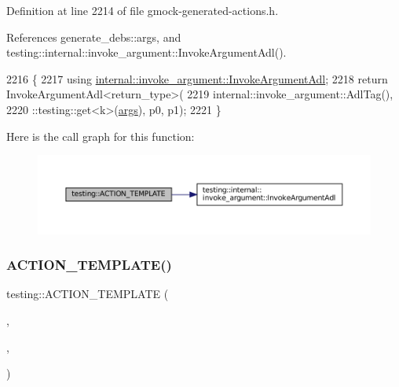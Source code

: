 Definition at line 2214 of file gmock-\/generated-\/actions.\+h.



References generate\+\_\+debs\+::args, and testing\+::internal\+::invoke\+\_\+argument\+::\+Invoke\+Argument\+Adl().


\begin{DoxyCode}
2216                                             \{
2217   \textcolor{keyword}{using} \hyperlink{namespacetesting_1_1internal_1_1invoke__argument_abd36164191a3e386c50243074854b272}{internal::invoke\_argument::InvokeArgumentAdl};
2218   \textcolor{keywordflow}{return} InvokeArgumentAdl<return\_type>(
2219       internal::invoke\_argument::AdlTag(),
2220       ::testing::get<k>(\hyperlink{namespacegenerate__debs_a75f9143e38df82d83b2e8a6f99cae02c}{args}), p0, p1);
2221 \}
\end{DoxyCode}
Here is the call graph for this function\+:
\nopagebreak
\begin{figure}[H]
\begin{center}
\leavevmode
\includegraphics[width=350pt]{namespacetesting_a39bf6c49dc1323cc9539a12249e60aba_cgraph}
\end{center}
\end{figure}
\mbox{\label{namespacetesting_ac50647216fdf5197899a3d5034a9a670}} 
\subsubsection{\texorpdfstring{A\+C\+T\+I\+O\+N\+\_\+\+T\+E\+M\+P\+L\+A\+T\+E()}{ACTION\_TEMPLATE()}\hspace{0.1cm}{\footnotesize\ttfamily [10/28]}}
{\footnotesize\ttfamily testing\+::\+A\+C\+T\+I\+O\+N\+\_\+\+T\+E\+M\+P\+L\+A\+TE (\begin{DoxyParamCaption}\item[{Invoke\+Argument}]{,  }\item[{H\+A\+S\+\_\+1\+\_\+\+T\+E\+M\+P\+L\+A\+T\+E\+\_\+\+P\+A\+R\+A\+MS(int, k)}]{,  }\item[{A\+N\+D\+\_\+3\+\_\+\+V\+A\+L\+U\+E\+\_\+\+P\+A\+R\+A\+MS(p0, p1, p2)}]{ }\end{DoxyParamCaption})}



